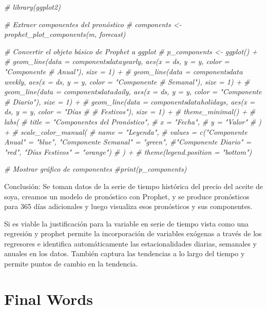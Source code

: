 \documentclass[
]{book}
\newenvironment{Shaded}{\begin{snugshade}}{\end{snugshade}}
\newcommand{\CommentTok}[1]{\textcolor[rgb]{0.56,0.35,0.01}{\textit{#1}}}
\begin{document}
\begin{Shaded}
\begin{Highlighting}[]
\CommentTok{\# library(ggplot2)}

\CommentTok{\# Extraer componentes del pronóstico}
\CommentTok{\# components \textless{}{-} prophet\_plot\_components(m, forecast)}

\CommentTok{\# Convertir el objeto básico de Prophet a ggplot}
\CommentTok{\# p\_components \textless{}{-} ggplot() +}
\CommentTok{\#  geom\_line(data = components$data$yearly, aes(x = ds, y = y, color = "Componente \# Anual"), size = 1) +}
\CommentTok{\#  geom\_line(data = components$data$weekly, aes(x = ds, y = y, color = "Componente \# Semanal"), size = 1) +}
\CommentTok{\#  geom\_line(data = components$data$daily, aes(x = ds, y = y, color = "Componente \# Diario"), size = 1) +}
\CommentTok{\#  geom\_line(data = components$data$holidays, aes(x = ds, y = y, color = "Días \# \# Festivos"), size = 1) +}
\CommentTok{\#  theme\_minimal() +}
\CommentTok{\#  labs(}
\CommentTok{\#    title = "Componentes del Pronóstico",}
\CommentTok{\#    x = "Fecha",}
\CommentTok{\#    y = "Valor"}
\CommentTok{\#  ) +}
\CommentTok{\#  scale\_color\_manual(}
\CommentTok{\#    name = "Leyenda",}
\CommentTok{\#    values = c("Componente Anual" = "blue", "Componente Semanal" = "green", \#"Componente Diario" = "red", "Días Festivos" = "orange")}
\CommentTok{\#  ) +}
\CommentTok{\#  theme(legend.position = "bottom")}

\CommentTok{\# Mostrar gráfico de componentes}
\CommentTok{\#print(p\_components)}
\end{Highlighting}
\end{Shaded}

Conclusión: Se toman datos de la serie de tiempo histórica del precio del aceite de soya, creamos un modelo de pronóstico con Prophet, y se produce pronósticos para 365 días adicionales y luego visualiza esos pronósticos y sus componentes.

Si es viable la justificación para la variable en serie de tiempo vista como una regresión y prophet permite la incorporación de variables exógenas a través de los regresores e identifica automáticamente las estacionalidades diarias, semanales y anuales en los datos. También captura las tendencias a lo largo del tiempo y permite puntos de cambio en la tendencia.

\hypertarget{final-words}{%
\chapter{Final Words}\label{final-words}}
\end{document}
